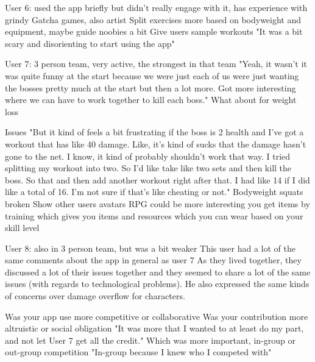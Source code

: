 \documentclass{l4proj}
\begin{document}
User 6: used the app briefly but didn't really engage with it, has experience with grindy Gatcha games, also artist
  Split exercises more based on bodyweight and equipment, maybe guide noobies a bit
  Give users sample workouts
  "It was a bit scary and disorienting to start using the app"

User 7: 3 person team, very active, the strongest in that team  
  "Yeah, it wasn't it was quite funny at the start because we were just each of us were just wanting the bosses pretty much at the start but then a lot more. Got more interesting where we can have to work together to kill each boss."
  What about for weight loss

  Issues
    "But it kind of feels a bit frustrating if the boss is 2 health and I've got a workout that has like 40 damage. Like, it's kind of sucks that the damage hasn't gone to the net. I know, it kind of probably shouldn't work that way. I tried splitting my workout into two. So I'd like take like two sets and then kill the boss. So that and then add another workout right after that. I had like 14 if I did like a total of 16. I'm not sure if that's like cheating or not."
    Bodyweight squats broken
    Show other users avatars
    RPG could be more interesting you get items by training which gives you items and resources which you can wear based on your skill level

User 8: also in 3 person team, but was a bit weaker
  This user had a lot of the same comments about the app in general as user 7
  As they lived together, they discussed a lot of their issues together and they seemed to share a lot of the same issues (with regards to technological problems). He also expressed the same kinds of concerns over damage overflow for characters.



  Was your app use more competitive or collaborative
  Was your contribution more altruistic or social obligation 
    "It was more that I wanted to at least do my part, and not let User 7 get all the credit." 
  Which was more important, in-group or out-group competition
    "In-group because I knew who I competed with"
\end{document}
